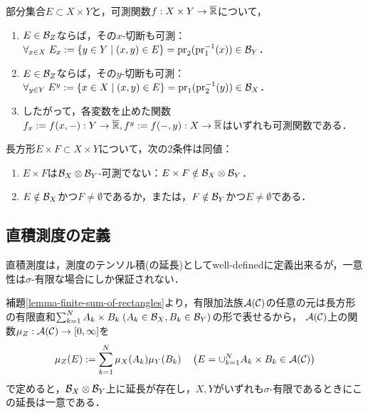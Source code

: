\documentclass[uplatex, dvipdfmx]{jsreport}
\begin{document}
\begin{lemma}
    部分集合$E\subset X\times Y$と，可測関数$f:X\times Y\to\overline{\mathbb{R}}$について，
    \begin{enumerate}
        \item $E\in\mathcal{B}_Z$ならば，その$x$-切断も可測：$\forall_{x\in X}\;E_x:=\{y\in Y\mid (x,y)\in E\}=\mathrm{pr}_2(\mathrm{pr}_1^{-1}(x))\in\mathcal{B}_Y$．
        \item $E\in\mathcal{B}_Z$ならば，その$y$-切断も可測：$\forall_{y\in Y}\;E^y:=\{x\in X\mid (x,y)\in E\}=\mathrm{pr}_1(\mathrm{pr}_2^{-1}(y))\in\mathcal{B}_X$．
        \item したがって，各変数を止めた関数$f_x:=f(x,-):Y\to\overline{\mathbb{R}},f^y:=f(-,y):X\to\overline{\mathbb{R}}$はいずれも可測関数である．
    \end{enumerate}
\end{lemma}

\begin{corollary}
    長方形$E\times F\subset X\times Y$について，次の2条件は同値：
    \begin{enumerate}
        \item $E\times F$は$\mathcal{B}_X\otimes\mathcal{B}_Y$-可測でない：$E\times F\notin\mathcal{B}_X\otimes\mathcal{B}_Y$．
        \item $E\notin\mathcal{B}_X$かつ$F\ne\emptyset$であるか，または，$F\notin\mathcal{B}_Y$かつ$E\ne\emptyset$である．
    \end{enumerate}
\end{corollary}

\subsection{直積測度の定義}

\begin{tcolorbox}[colframe=ForestGreen, colback=ForestGreen!10!white,breakable,colbacktitle=ForestGreen!40!white,coltitle=black,fonttitle=\bfseries\sffamily,
title=]
    直積測度は，測度のテンソル積(の延長)としてwell-definedに定義出来るが，一意性は$\sigma$-有限な場合にしか保証されない．
\end{tcolorbox}

\begin{definition}
    補題\ref{lemma-finite-sum-of-rectangles}より，有限加法族$\mathcal{A}(\mathcal{C})$の任意の元は長方形の有限直和$\sum_{k=1}^NA_k\times B_k\;(A_k\in\mathcal{B}_X,B_k\in\mathcal{B}_Y)$の形で表せるから，
    $\mathcal{A}(\mathcal{C})$上の関数$\mu_Z:\mathcal{A}(\mathcal{C})\to[0,\infty]$を\[\mu_Z(E):=\sum_{k=1}^N\mu_X(A_k)\mu_Y(B_k)\quad\left(E=\cup_{k=1}^NA_k\times B_k\in\mathcal{A}(\mathcal{C})\right)\]
    で定めると，$\mathcal{B}_X\otimes\mathcal{B}_Y$上に延長が存在し，$X,Y$がいずれも$\sigma$-有限であるときにこの延長は一意である．
\end{definition}
\end{document}
